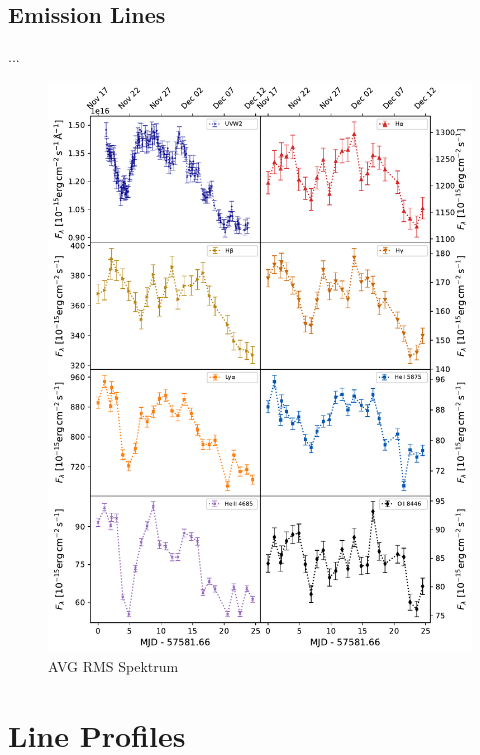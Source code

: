 \subsection{Emission Lines}
...
\begin{figure}[!ht]
	\centering
	\includegraphics[width=1\textwidth]{pictures/Chapter4/lightcurves/NGC4593_Lines_UVW2.pdf}
	\caption{AVG RMS Spektrum}
	\label{fig:emission_line_lightcurves}
\end{figure}





\section{Line Profiles}

